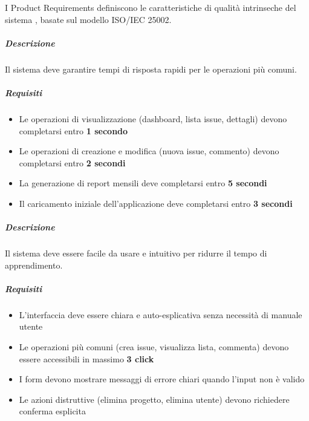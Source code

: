 I Product Requirements definiscono le caratteristiche di qualità intrinseche del sistema \productname, basate sul modello ISO/IEC 25002.

\vspace{0.5cm}

\newpage

\begin{reqbox}[title=REQ-NFR-01: Performance]
\label{subsubsec:req-nfr-performance}

\subparagraph{Descrizione}
Il sistema deve garantire tempi di risposta rapidi per le operazioni più comuni.

\subparagraph{Requisiti}
\begin{itemize}[leftmargin=1.1em]
\item Le operazioni di visualizzazione (dashboard, lista issue, dettagli) devono completarsi entro \textbf{1 secondo}
\item Le operazioni di creazione e modifica (nuova issue, commento) devono completarsi entro \textbf{2 secondi}
\item La generazione di report mensili deve completarsi entro \textbf{5 secondi}
\item Il caricamento iniziale dell'applicazione deve completarsi entro \textbf{3 secondi}
\end{itemize}

\end{reqbox}

\vspace{0.5cm}


\begin{reqbox}[title=REQ-NFR-02: Usabilità]
\label{subsubsec:req-nfr-usability}

\subparagraph{Descrizione}
Il sistema deve essere facile da usare e intuitivo per ridurre il tempo di apprendimento.

\subparagraph{Requisiti}
\begin{itemize}[leftmargin=1.1em]
\item L'interfaccia deve essere chiara e auto-esplicativa senza necessità di manuale utente
\item Le operazioni più comuni (crea issue, visualizza lista, commenta) devono essere accessibili in massimo \textbf{3 click}
\item I form devono mostrare messaggi di errore chiari quando l'input non è valido
\item Le azioni distruttive (elimina progetto, elimina utente) devono richiedere conferma esplicita
\end{itemize}

\end{reqbox}

